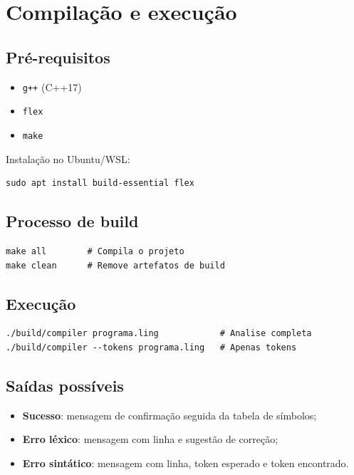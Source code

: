 \documentclass[a4paper, 12pt]{article}
\begin{document}
\section{Compila\c{c}\~ao e execu\c{c}\~ao}

\subsection{Pr\'e-requisitos}

\begin{itemize}
    \item \texttt{g++} (C++17)
    \item \texttt{flex}
    \item \texttt{make}
\end{itemize}

Instala\c{c}\~ao no Ubuntu/WSL:

\begin{lstlisting}[numbers=none]
sudo apt install build-essential flex
\end{lstlisting}

\subsection{Processo de build}

\begin{lstlisting}[numbers=none]
make all        # Compila o projeto
make clean      # Remove artefatos de build
\end{lstlisting}

\subsection{Execu\c{c}\~ao}

\begin{lstlisting}[numbers=none]
./build/compiler programa.ling            # Analise completa
./build/compiler --tokens programa.ling   # Apenas tokens
\end{lstlisting}

\subsection{Sa\'idas poss\'iveis}

\begin{itemize}
    \item \textbf{Sucesso}: mensagem de confirma\c{c}\~ao seguida da tabela de s\'imbolos;
    \item \textbf{Erro l\'exico}: mensagem com linha e sugest\~ao de corre\c{c}\~ao;
    \item \textbf{Erro sint\'atico}: mensagem com linha, token esperado e token encontrado.
\end{itemize}
\end{document}
